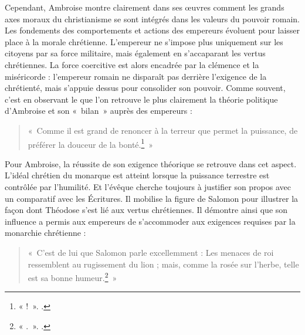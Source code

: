 \bigskip

Cependant, Ambroise montre clairement dans ses œuvres comment les grands axes moraux du christianisme se sont intégrés dans les valeurs du pouvoir romain. Les fondements des comportements et actions des empereurs évoluent pour laisser place à la morale chrétienne. L'empereur ne s'impose plus uniquement sur les citoyens par sa force militaire, mais également en s'accaparant les vertus chrétiennes. La force coercitive est alors encadrée par la clémence et la miséricorde : l'empereur romain ne disparaît pas derrière l'exigence de la chrétienté, mais s'appuie dessus pour consolider son pouvoir. Comme souvent, c'est en observant le  que l'on retrouve le plus clairement la théorie politique d'Ambroise et son «~bilan~» auprès des empereurs :

\bigskip

\begin{quote}
«~Comme il est grand de renoncer à la terreur que permet la puissance, de préférer la douceur de la bonté.\footnote{«  !~». \cite[]{ambroise_mort_theodose}.}~»
\end{quote}

\bigskip

Pour Ambroise, la réussite de son exigence théorique se retrouve dans cet aspect. L'idéal chrétien du monarque est atteint lorsque la puissance terrestre est contrôlée par l'humilité. Et l'évêque cherche toujours à justifier son propos avec un comparatif avec les Écritures. Il mobilise la figure de Salomon pour illustrer la façon dont Théodose s'est lié aux vertus chrétiennes. Il démontre ainsi que son influence a permis aux empereurs de s'accommoder aux exigences requises par la monarchie chrétienne :

\bigskip

\begin{quote}
«~C’est de lui que Salomon parle excellemment : Les menaces de roi ressemblent au rugissement du lion ; mais, comme la rosée sur l'herbe, telle est sa bonne humeur.\footnote{« .~». \cite[]{ambroise_mort_theodose}.}~»
\end{quote}

\bigskip

